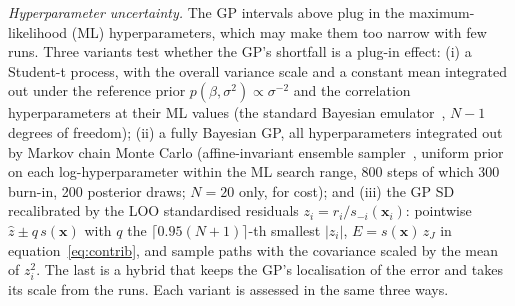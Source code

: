 \emph{Hyperparameter uncertainty.} The GP intervals above plug in the
maximum-likelihood (ML) hyperparameters, which may make them too narrow
with few runs. Three variants test whether the GP's shortfall is a plug-in
effect: (i) a Student-t process, with the overall variance scale and a
constant mean integrated out under the reference prior
$p(\beta,\sigma^2)\propto\sigma^{-2}$ and the correlation hyperparameters at
their ML values (the standard Bayesian emulator~\cite{ohagan2006}, $N-1$
degrees of freedom); (ii) a fully Bayesian GP, all hyperparameters
integrated out by Markov chain Monte Carlo (affine-invariant ensemble
sampler~\cite{foremanmackey2013}, uniform prior on each log-hyperparameter
within the ML search range, 800 steps of which 300 burn-in, 200 posterior
draws; $N=20$ only, for cost); and (iii) the GP SD recalibrated by the LOO
standardised residuals $z_i=r_i/s_{-i}(\mathbf x_i)$: pointwise
$\hat z\pm q\,s(\mathbf x)$ with $q$ the $\lceil0.95(N+1)\rceil$-th
smallest $|z_i|$, $E=s(\mathbf x)\,z_J$ in equation~\eqref{eq:contrib}, and
sample paths with the covariance scaled by the mean of $z_i^2$. The last is
a hybrid that keeps the GP's localisation of the error and takes its scale
from the runs. Each variant is assessed in the same three ways.

